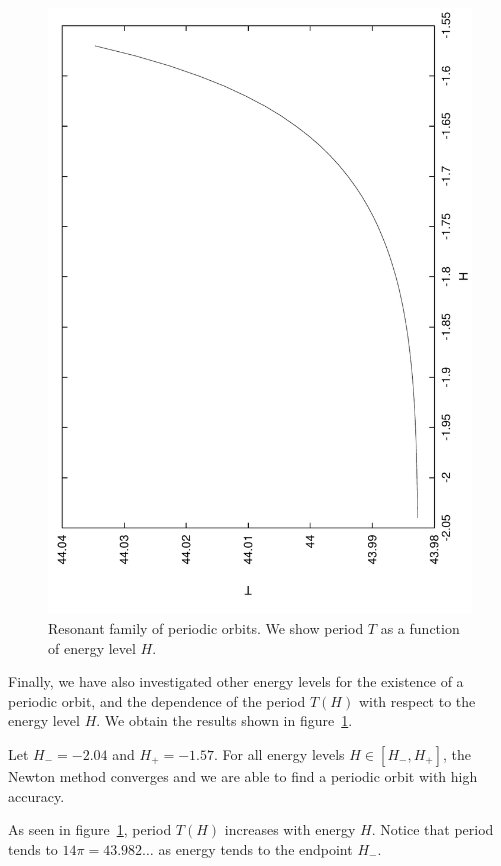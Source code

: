\documentclass[a4paper]{amsart}
\theoremstyle{remark}
\begin{document}
\begin{figure}
\includegraphics[angle=-90,width=\textwidth]{figs/porbits}
\caption{Resonant family of periodic orbits. 
We show period $T$ as a function of energy level $H$.}
\label{fig:porbits}
\end{figure}

Finally, we have also investigated other energy levels for the
existence of a periodic orbit, and the dependence of the period $T(H)$
with respect to the energy level $H$. We obtain the results shown in
figure~\ref{fig:porbits}.

Let $H_-=-2.04$ and $H_+=-1.57$.
For all energy levels $H\in [H_-,H_+]$, the Newton method converges
and we are able to find a periodic orbit with high accuracy.

As seen in figure~\ref{fig:porbits}, period $T(H)$ increases with energy $H$.
Notice that period tends to $14\pi=43.982\dots$ as energy tends to the
endpoint $H_-$.
\end{document}
